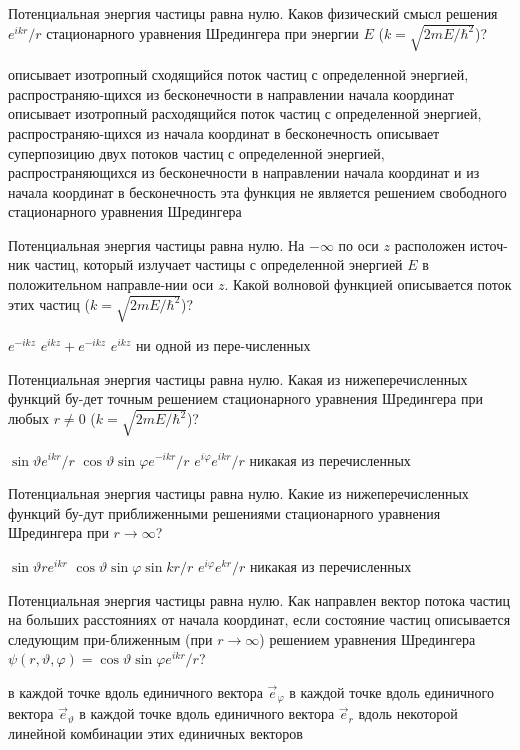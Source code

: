 \documentclass[11pt,a4paper]{exam}
\begin{document}
\begin{questions}
\question Потенциальная энергия частицы равна нулю. Каков физический смысл решения ${e^{ikr}}/r$ стационарного уравнения Шредингера при энергии $E$ ($k = \sqrt {2mE/{\hbar ^2}} $)? 
\begin{choices}
\choice описывает изотропный сходящийся поток частиц с определенной энергией, распространяю-щихся из бесконечности в направлении начала координат
\choice описывает изотропный расходящийся поток частиц с определенной энергией, распространяю-щихся из начала координат в бесконечность
\choice описывает суперпозицию двух потоков частиц с определенной энергией, распространяющихся из бесконечности в направлении начала координат и из начала координат в бесконечность
\choice эта функция не является решением свободного стационарного уравнения Шредингера
\end{choices}

\question Потенциальная энергия частицы равна нулю. На $ - \infty $ по оси $z$ расположен источ-ник частиц, который излучает частицы с определенной энергией $E$ в положительном направле-нии оси $z$. Какой волновой функцией описывается поток этих частиц ($k = \sqrt {2mE/{\hbar ^2}} $)?
\begin{choices}
\choice ${e^{ - ikz}}$ 
\choice ${e^{ikz}} + {e^{ - ikz}}$ 
\choice ${e^{ikz}}$    
\choice ни одной из пере-численных
\end{choices}

\question Потенциальная энергия частицы равна нулю. Какая из нижеперечисленных функций бу-дет точным решением стационарного уравнения Шредингера при любых $r \ne 0$ ($k = \sqrt {2mE/{\hbar ^2}} $)?
\begin{choices}
\choice $\sin \vartheta {e^{ikr}}/r$        
\choice $\cos \vartheta \sin \varphi {e^{ - ikr}}/r$
\choice ${e^{i\varphi }}{e^{ikr}}/r$        
\choice никакая из перечисленных
\end{choices}

\question Потенциальная энергия частицы равна нулю. Какие из нижеперечисленных функций бу-дут приближенными решениями стационарного уравнения Шредингера при $r \to \infty $?
\begin{choices}
\choice $\sin \vartheta r{e^{ikr}}$         
\choice $\cos \vartheta \sin \varphi \sin kr/r$   
\choice ${e^{i\varphi }}{e^{kr}}/r$         
\choice никакая из перечисленных
\end{choices}

\question Потенциальная энергия частицы равна нулю. Как направлен вектор потока частиц на больших расстояниях от начала координат, если состояние частиц описывается следующим при-ближенным (при $r \to \infty $) решением уравнения Шредингера $\psi (r,\vartheta ,\varphi ) = \cos \vartheta \sin \varphi {e^{ikr}}/r$? 
\begin{choices}
\choice в каждой точке вдоль единичного вектора ${\vec e_\varphi }$
\choice в каждой точке вдоль единичного вектора ${\vec e_\vartheta }$
\choice в каждой точке вдоль единичного вектора ${\vec e_r}$
\choice вдоль некоторой линейной комбинации этих единичных векторов
\end{choices}


\end{questions}
\end{document}
